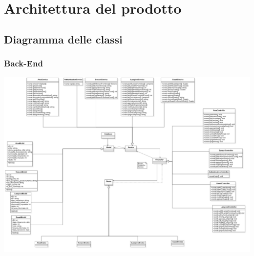 \documentclass[12pt]{article}
\begin{document}
\section{Architettura del prodotto}

\subsection{Diagramma delle classi}
\subsubsection{Back-End}
\includegraphics[width=450pt]{Back-End.png}
\end{document}
